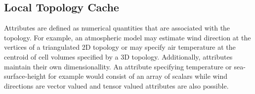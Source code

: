 \subsection{Local Topology Cache}


Attributes are defined as numerical quantities that are associated
with the topology. For example, an atmospheric model may estimate wind
direction at the vertices of a triangulated 2D topology or may specify
air temperature at the centroid of cell volumes specified by a 3D
topology. Additionally, attributes maintain their own
dimensionallity. An attribute specifying temperature or
sea-surface-height for example would consist of an array of scalars
while wind directions are vector valued and tensor valued attributes
are also possible.
